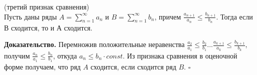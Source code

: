 \begin{theor} (третий признак сравнения)\\
Пусть даны ряды $A=\sum\limits_{n=1}^{\infty} a_n$ и 
$B=\sum\limits_{n=1}^{\infty} b_n$, причем 
$\frac{a_{n+1}}{a_n}\leqslant \frac{b_{n+1}}{b_n}$. Тогда если
В сходится, то и А сходится.
\end{theor}
\textbf{Доказательство.} 
Перемножив положительные неравенства $\frac{a_2}{a_1}\leqslant \frac{b_2}{b_1}
...\frac{a_{k+1}}{a_k}\leqslant 
\frac{b_{k+1}}{b_k}$, получим $\frac{a_n}{a_1}\leqslant \frac{b_n}{b_1}$, 
откуда $a_n\leqslant b_n\cdot const$. Из признака сравнения в оценочной форме
получаем, что ряд $A$ сходится, если сходится ряд  $B$. $\square$ 


